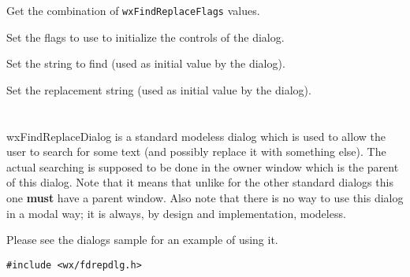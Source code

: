Get the combination of {\tt wxFindReplaceFlags} values.

\label{wxfindreplacedatasetflags}


Set the flags to use to initialize the controls of the dialog.

\label{wxfindreplacedatasetfindstring}


Set the string to find (used as initial value by the dialog).

\label{wxfindreplacedatasetreplacestring}


Set the replacement string (used as initial value by the dialog).

\section{}\label{wxfindreplacedialog}

wxFindReplaceDialog is a standard modeless dialog which is used to allow the
user to search for some text (and possibly replace it with something else).
The actual searching is supposed to be done in the owner window which is the
parent of this dialog. Note that it means that unlike for the other standard
dialogs this one {\bf must} have a parent window. Also note that there is no
way to use this dialog in a modal way; it is always, by design and
implementation, modeless.

Please see the dialogs sample for an example of using it.


\begin{verbatim}
#include <wx/fdrepdlg.h>
\end{verbatim}




\label{wxfindreplacedialogctor}


